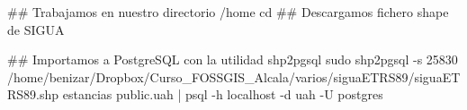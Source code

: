 \lstset{caption=Importación de estancias}
\begin{bash}
## Trabajamos en nuestro directorio /home
cd
## Descargamos fichero shape de SIGUA

## Importamos a PostgreSQL con la utilidad shp2pgsql
sudo shp2pgsql -s 25830 /home/benizar/Dropbox/Curso_FOSSGIS_Alcala/varios/siguaETRS89/siguaETRS89.shp  estancias public.uah  | psql -h localhost -d uah -U postgres
\end{bash}
